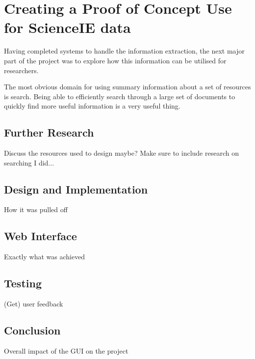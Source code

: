 \chapter{Creating a Proof of Concept Use for ScienceIE data}
Having completed systems to handle the information extraction, the next major part of the project was to explore how this information can be utilised for researchers. 

The most obvious domain for using summary information about a set of resources is search. Being able to efficiently search through a large set of documents to quickly find more useful information is a very useful thing.

\section{Further Research}
Discuss the resources used to design maybe?
Make sure to include research on searching I did...
\section{Design and Implementation}
How it was pulled off
\section{Web Interface}
Exactly what was achieved
\section{Testing}
(Get) user feedback
\section{Conclusion}
Overall impact of the GUI on the project
